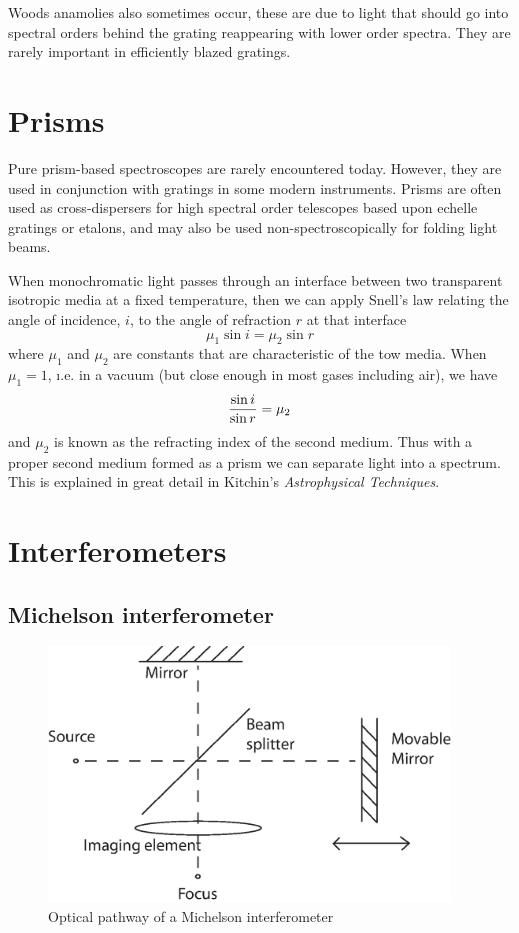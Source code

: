 Woods anamolies also sometimes occur, these are due to light that should go into spectral orders behind the grating reappearing with lower order spectra. They are rarely 
important in efficiently blazed gratings.

\section{Prisms}

Pure prism-based spectroscopes are rarely encountered today. However, they are used in 
conjunction with gratings in some modern instruments. Prisms are often used as cross-dispersers for high spectral order telescopes based upon echelle gratings or etalons, and may also be used non-spectroscopically for folding light beams.

When monochromatic light passes through an interface between two transparent isotropic
media at a fixed temperature, then we can apply Snell's law relating the angle of incidence, $i$, to the angle of refraction $r$ at that interface
\[ 
\mu_1\sin i=\mu_2\sin r
\]
where $\mu_1$ and $\mu_2$ are constants that are characteristic of the tow media. 
When $\mu_1=1$, {\i.e.} in a vacuum (but close enough in most gases including air), 
we have
\[
{\sin i\over\sin r}=\mu_2
\]
and $\mu_2$ is known as the refracting index of the second medium. Thus with a proper
second medium formed as a prism we can separate light into a spectrum. This is explained in great detail in Kitchin's {\it Astrophysical Techniques}.

\section{Interferometers}

\subsection{Michelson interferometer}

\begin{figure}[h]
  \centering
	\includegraphics[width=0.95\textwidth]{michelson-interferometer.eps}
  \caption{Optical pathway of a Michelson interferometer}
  \label{fig:michelson-interferometer}
\end{figure}

